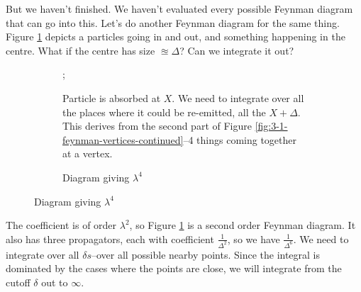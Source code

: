 \documentclass[]{article}
\begin{document}
But we haven't finished. We haven't evaluated every possible Feynman diagram that can go into this. Let's do another Feynman diagram for the same thing. Figure \ref{fig:particles3-another-Feynman} depicts a particles going in and out, and something happening in the centre. What if the centre has size $\approxeq \Delta$? Can we integrate it out?

\begin{figure}[H]
	\begin{center}
		\caption{More diagrams from Figure \ref{fig:mimicking:vertex}}
		\begin{subfigure}[t]{0.45\textwidth}
			\caption{Particle is absorbed at $X$. We need to integrate over all the places where it could be re-emitted, all the $X+\Delta$. This derives from the second part of Figure \ref{fig:3-1-feynman-vertices-continued}--4 things coming together at a vertex.}\label{fig:particles3-another-Feynman}
			;
		\end{subfigure}
		\hfill
		\begin{subfigure}[t]{0.45\textwidth}
		\begin{center}
				\caption{Diagram giving $\lambda^4$}\label{fig:particles3-yet-another-Feynman}
		\end{center}
		\end{subfigure}
	\end{center}
\end{figure}

The coefficient is of order $\lambda^2$, so Figure \ref{fig:particles3-another-Feynman} is a second order Feynman diagram. It also has three propagators, each with coefficient $\frac{1}{\Delta^2}$, so we have $\frac{1}{\Delta^6}$. We need to integrate over all $\delta s$--over all possible nearby points. Since the integral is dominated by the cases where the points are close, we will integrate from the cutoff $\delta$ out to $\infty$.
\end{document}
